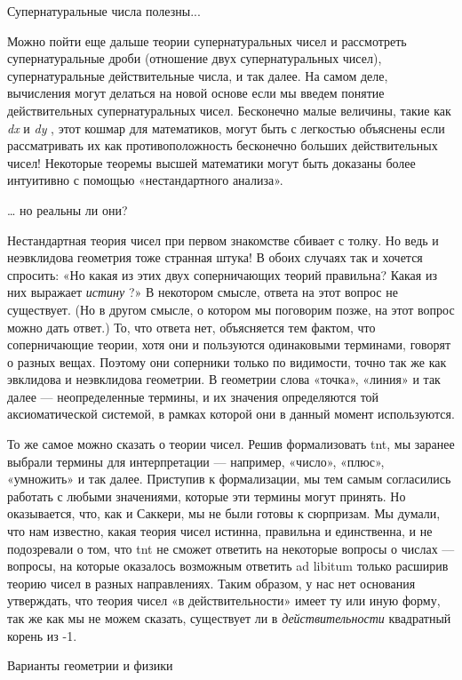 \documentclass[../main.tex]{subfiles}
\begin{document}
Супернатуральные числа полезны...

Можно пойти еще дальше теории супернатуральных чисел и рассмотреть супернатуральные дроби (отношение двух супернатуральных чисел), супернатуральные действительные числа, и так далее. На самом деле, вычисления могут делаться на новой основе если мы введем понятие действительных супернатуральных чисел. Бесконечно малые величины, такие как \emph{dx} и \emph{dy} , этот кошмар для математиков, могут быть с легкостью объяснены если рассматривать их как противоположность бесконечно больших действительных чисел! Некоторые теоремы высшей математики могут быть доказаны более интуитивно с помощью «нестандартного анализа».

\ldots{} но реальны ли они?

Нестандартная теория чисел при первом знакомстве сбивает с толку. Но ведь и неэвклидова геометрия тоже странная штука! В обоих случаях так и хочется спросить: «Но какая из этих двух соперничающих теорий правильна? Какая из них выражает \emph{истину} ?» В некотором смысле, ответа на этот вопрос не существует. (Но в другом смысле, о котором мы поговорим позже, на этот вопрос можно дать ответ.) То, что ответа нет, объясняется тем фактом, что соперничающие теории, хотя они и пользуются одинаковыми терминами, говорят о разных вещах. Поэтому они соперники только по видимости, точно так же как эвклидова и неэвклидова геометрии. В геометрии слова «точка», «линия» и так далее --- неопределенные термины, и их значения определяются той аксиоматической системой, в рамках которой они в данный момент используются.

То же самое можно сказать о теории чисел. Решив формализовать \acs{tnt}, мы заранее выбрали термины для интерпретации --- например, «число», «плюс», «умножить» и так далее. Приступив к формализации, мы тем самым согласились работать с любыми значениями, которые эти термины могут принять. Но оказывается, что, как и Саккери, мы не были готовы к сюрпризам. Мы думали, что нам известно, какая теория чисел истинна, правильна и единственна, и не подозревали о том, что \acs{tnt} не сможет ответить на некоторые вопросы о числах --- вопросы, на которые оказалось возможным ответить ad libitum только расширив теорию чисел в разных направлениях. Таким образом, у нас нет основания утверждать, что теория чисел «в действительности» имеет ту или иную форму, так же как мы не можем сказать, существует ли в \emph{действительности} квадратный корень из -1.

Варианты геометрии и физики
\end{document}
